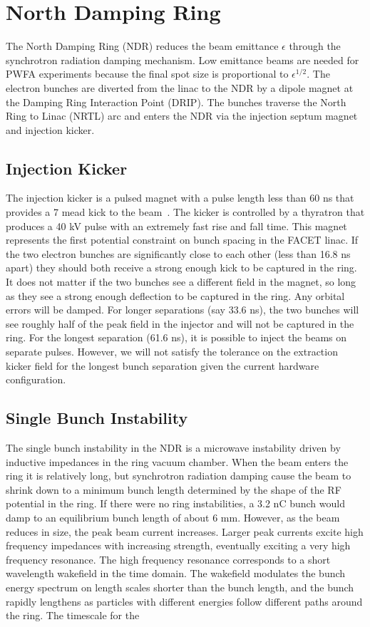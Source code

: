 \documentclass[aps,prl,preprint,groupedaddress]{revtex4-1}
\begin{document}
\section{North Damping Ring}
The North Damping Ring (NDR) reduces the beam emittance $\epsilon$ through the synchrotron radiation damping mechanism. Low emittance beams are needed for PWFA experiments because the final spot size is proportional to $\epsilon^{1/2}$. The electron bunches are diverted from the linac to the NDR by a dipole magnet at the Damping Ring Interaction Point (DRIP). The bunches traverse the North Ring to Linac (NRTL) arc and enters the NDR via the injection septum magnet and injection kicker.  

\subsection{Injection Kicker}
The injection kicker is a pulsed magnet with a pulse length less than 60 ns that provides a 7 mead kick to the beam~\cite{kicker}. The kicker is controlled by a thyratron that produces a 40 kV pulse with an extremely fast rise and fall time. This magnet represents the first potential constraint on bunch spacing in the FACET linac. If the two electron bunches are significantly close to each other (less than 16.8 ns apart) they should both receive a strong enough kick to be captured in the ring. It does not matter if the two bunches see a different field in the magnet, so long as they see a strong enough deflection to be captured in the ring. Any orbital errors will be damped. For longer separations (say 33.6 ns), the two bunches will see roughly half of the peak field in the injector and will not be captured in the ring. For the longest separation (61.6 ns), it is possible to inject the beams on separate pulses. However, we will not satisfy the tolerance on the extraction kicker field for the longest bunch separation given the current hardware configuration.

\subsection{Single Bunch Instability}
The single bunch instability in the NDR is a microwave instability driven by inductive impedances in the ring vacuum chamber. When the beam enters the ring it is relatively long, but synchrotron radiation damping cause the beam to shrink down to a minimum bunch length determined by the shape of the RF potential in the ring. If there were no ring instabilities, a 3.2 nC bunch would damp to an equilibrium bunch length of about 6 mm. However, as the beam reduces in size, the peak beam current increases. Larger peak currents excite high frequency impedances with increasing strength, eventually exciting a very high frequency resonance. The high frequency resonance corresponds to a short wavelength wakefield in the time domain. The wakefield modulates the bunch energy spectrum on length scales shorter than the bunch length, and the bunch rapidly lengthens as particles with different energies follow different paths around the ring. The timescale for the 
\end{document}
